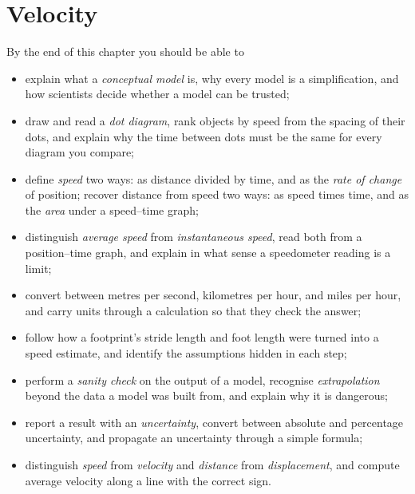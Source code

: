 

\setcounter{chapter}{0}

\chapter{Velocity}

\begin{tcolorbox}[enhanced,colback=white,colframe=teal,sharp corners,boxrule=1pt,
  title=\textbf{In this chapter},coltitle=white,colbacktitle=teal,left=3mm,right=3mm]
By the end of this chapter you should be able to
\begin{itemize}[itemsep=2pt,topsep=2pt]
  \item explain what a \emph{conceptual model} is, why every model is a simplification, and how scientists decide whether a model can be trusted;
  \item draw and read a \emph{dot diagram}, rank objects by speed from the spacing of their dots, and explain why the time between dots must be the same for every diagram you compare;
  \item define \emph{speed} two ways: as distance divided by time, and as the \emph{rate of change} of position; recover distance from speed two ways: as speed times time, and as the \emph{area} under a speed--time graph;
  \item distinguish \emph{average speed} from \emph{instantaneous speed}, read both from a position--time graph, and explain in what sense a speedometer reading is a limit;
  \item convert between metres per second, kilometres per hour, and miles per hour, and carry units through a calculation so that they check the answer;
  \item follow how a footprint's stride length and foot length were turned into a speed estimate, and identify the assumptions hidden in each step;
  \item perform a \emph{sanity check} on the output of a model, recognise \emph{extrapolation} beyond the data a model was built from, and explain why it is dangerous;
  \item report a result with an \emph{uncertainty}, convert between absolute and percentage uncertainty, and propagate an uncertainty through a simple formula;
  \item distinguish \emph{speed} from \emph{velocity} and \emph{distance} from \emph{displacement}, and compute average velocity along a line with the correct sign.
\end{itemize}
\end{tcolorbox}

